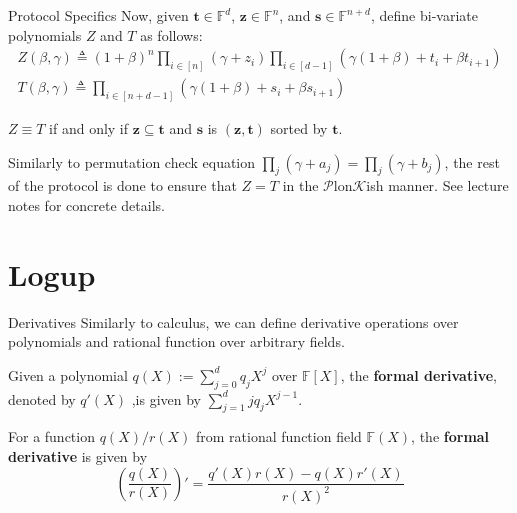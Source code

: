 \documentclass{zkdl-presentation-template}
\begin{document}
    \begin{frame}{Protocol Specifics}
        Now, given $\boldsymbol{t} \in \mathbb{F}^d$, $\boldsymbol{z} \in \mathbb{F}^n$,
        and $\boldsymbol{s} \in \mathbb{F}^{n+d}$, define bi-variate polynomials $Z$ and
        $T$ as follows:
        \begin{gather*}
            Z(\beta,\gamma) \triangleq (1+\beta)^n \prod_{i \in [n]}(\gamma+z_i)\prod_{i \in [d-1]}(\gamma(1+\beta)+t_i+\beta t_{i+1}) \\
            T(\beta,\gamma) \triangleq \prod_{i \in [n+d-1]} (\gamma(1+\beta)+s_i+\beta s_{i+1})
        \end{gather*}

        \begin{theorem}
            $Z \equiv T$ if and only if $\boldsymbol{z} \subseteq \boldsymbol{t}$ and
            $\boldsymbol{s}$ is $(\boldsymbol{z},\boldsymbol{t})$ sorted by
            $\boldsymbol{t}$.
        \end{theorem}

        Similarly to permutation check equation
        $\prod_{j}(\gamma+a_j)=\prod_j(\gamma+b_j)$, the rest of the protocol is
        done to ensure that $Z=T$ in the $\mathcal{P}$lon$\mathcal{K}$ish manner. See lecture notes for 
        concrete details.
    \end{frame}

    \section{Logup}

    \begin{frame}{Derivatives}
        Similarly to calculus, we can define derivative operations over polynomials 
        and rational function over arbitrary fields.
        \begin{definition}
            Given a polynomial $q(X) := \sum_{j=0}^d q_jX^j$ over $\mathbb{F}[X]$, the \textbf{formal
            derivative}, denoted by $q'(X)$ ,is given by
            $\sum_{j=1}^{d}jq_jX^{j-1}$.
        \end{definition}
        \begin{definition}
            For a function $q(X)/r(X)$ from rational function field
            $\mathbb{F}(X)$, the \textbf{formal derivative} is given by
            \begin{equation*}
                \left(\frac{q(X)}{r(X)}\right)' = \frac{q'(X)r(X) - q(X)r'(X)}{r(X)^2}
            \end{equation*}
        \end{definition}
    \end{frame}
\end{document}
